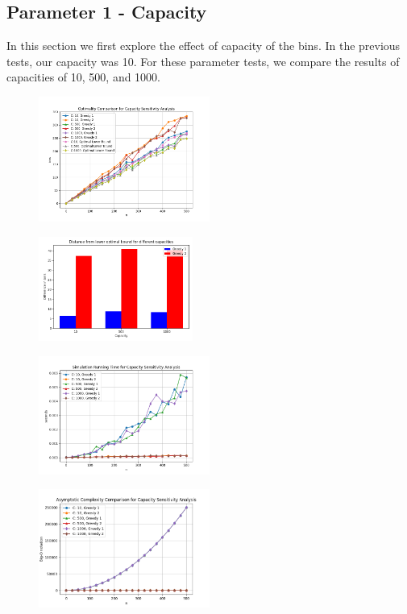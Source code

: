 \documentclass[11pt]{article}
\begin{document}
\begin{multicols}{2}
	\subsection{Parameter 1 - Capacity}
	In this section we first explore the effect of capacity of the bins. In the previous tests, our
	capacity was 10. For these parameter tests, we compare the results of capacities of 10, 500, and
	1000.
	\begin{figure}[H]
		\centering
		\includegraphics[width=0.5\textwidth]{images/s1_optimality.png}
	\end{figure}
	\begin{figure}[H]
		\centering
		\includegraphics[width=0.45\textwidth]{images/s1_optdiff.png}
	\end{figure}
	\begin{figure}[H]
		\centering
		\includegraphics[width=0.5\textwidth]{images/s1_simtime.png}
	\end{figure}
	\begin{figure}[H]
		\centering
		\includegraphics[width=0.5\textwidth]{images/s1_complexity.png}

\end{figure}
\end{multicols}
\end{document}
